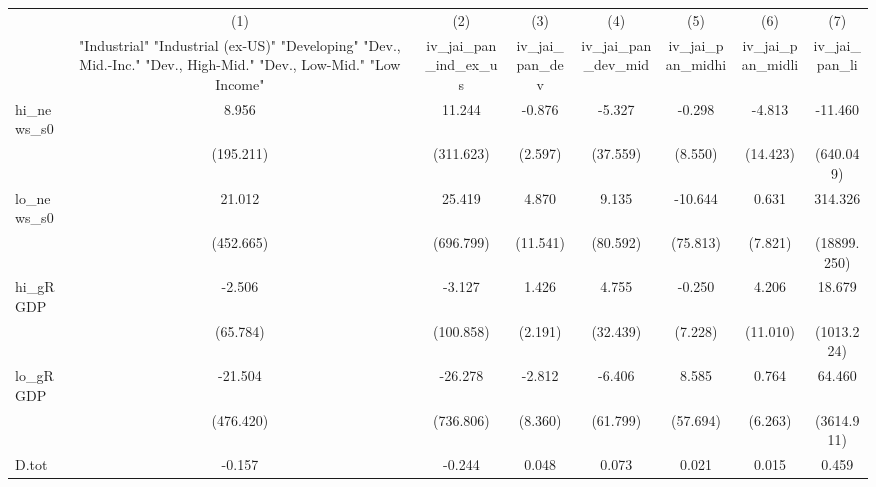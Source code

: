 {
\def\sym#1{\ifmmode^{#1}\else\(^{#1}\)\fi}
\begin{tabular}{l*{7}{c}}
\toprule
            &\multicolumn{1}{c}{(1)}&\multicolumn{1}{c}{(2)}&\multicolumn{1}{c}{(3)}&\multicolumn{1}{c}{(4)}&\multicolumn{1}{c}{(5)}&\multicolumn{1}{c}{(6)}&\multicolumn{1}{c}{(7)}\\
            &\multicolumn{1}{c}{ "Industrial" "Industrial (ex-US)" "Developing" "Dev., Mid.-Inc." "Dev., High-Mid."  "Dev., Low-Mid." "Low Income" }&\multicolumn{1}{c}{iv\_jai\_pan\_ind\_ex\_us}&\multicolumn{1}{c}{iv\_jai\_pan\_dev}&\multicolumn{1}{c}{iv\_jai\_pan\_dev\_mid}&\multicolumn{1}{c}{iv\_jai\_pan\_midhi}&\multicolumn{1}{c}{iv\_jai\_pan\_midli}&\multicolumn{1}{c}{iv\_jai\_pan\_li}\\
\midrule
hi\_news\_s0  &       8.956         &      11.244         &      -0.876         &      -5.327         &      -0.298         &      -4.813         &     -11.460         \\
            &   (195.211)         &   (311.623)         &     (2.597)         &    (37.559)         &     (8.550)         &    (14.423)         &   (640.049)         \\
\addlinespace
lo\_news\_s0  &      21.012         &      25.419         &       4.870         &       9.135         &     -10.644         &       0.631         &     314.326         \\
            &   (452.665)         &   (696.799)         &    (11.541)         &    (80.592)         &    (75.813)         &     (7.821)         & (18899.250)         \\
\addlinespace
hi\_gRGDP    &      -2.506         &      -3.127         &       1.426         &       4.755         &      -0.250         &       4.206         &      18.679         \\
            &    (65.784)         &   (100.858)         &     (2.191)         &    (32.439)         &     (7.228)         &    (11.010)         &  (1013.224)         \\
\addlinespace
lo\_gRGDP    &     -21.504         &     -26.278         &      -2.812         &      -6.406         &       8.585         &       0.764         &      64.460         \\
            &   (476.420)         &   (736.806)         &     (8.360)         &    (61.799)         &    (57.694)         &     (6.263)         &  (3614.911)         \\
\addlinespace
D.tot       &      -0.157         &      -0.244         &       0.048         &       0.073         &       0.021         &       0.015         &       0.459         \\

\end{tabular}}
